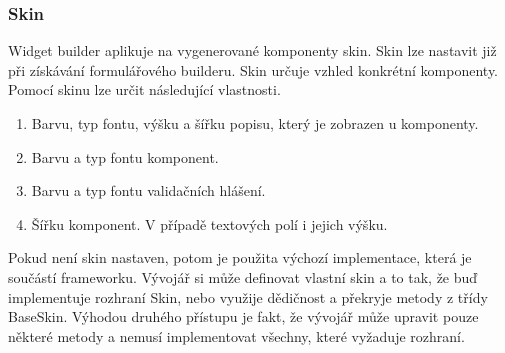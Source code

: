 \subsubsection{Skin}
Widget builder aplikuje na vygenerované komponenty skin. Skin lze nastavit již při získávání formulářového builderu. Skin určuje vzhled konkrétní komponenty. Pomocí skinu lze určit následující vlastnosti.
\begin{enumerate}
\item Barvu, typ fontu, výšku a šířku popisu, který je zobrazen u komponenty.
\item Barvu a typ fontu komponent.
\item Barvu a typ fontu validačních hlášení.
\item Šířku komponent. V případě textových polí i jejich výšku.
\end{enumerate}
Pokud není skin nastaven, potom je použita výchozí implementace, která je součástí frameworku. Vývojář si může definovat vlastní skin a to tak, že buď implementuje rozhraní Skin, nebo využije dědičnost a překryje metody z třídy BaseSkin. Výhodou druhého přístupu je fakt, že vývojář může upravit pouze některé metody a nemusí implementovat všechny, které vyžaduje rozhraní.
